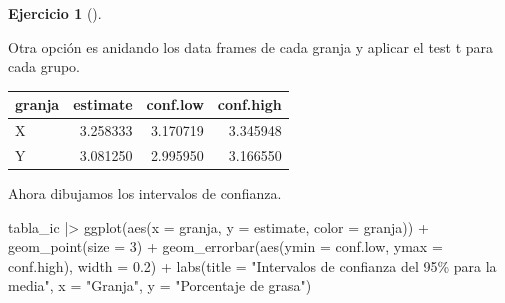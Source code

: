 \documentclass[
  a4paper,
]{scrreport}
\newenvironment{Shaded}{\begin{snugshade}}{\end{snugshade}}
\newcommand{\AttributeTok}[1]{\textcolor[rgb]{0.40,0.45,0.13}{#1}}
\newcommand{\DecValTok}[1]{\textcolor[rgb]{0.68,0.00,0.00}{#1}}
\newcommand{\FloatTok}[1]{\textcolor[rgb]{0.68,0.00,0.00}{#1}}
\newcommand{\FunctionTok}[1]{\textcolor[rgb]{0.28,0.35,0.67}{#1}}
\newcommand{\NormalTok}[1]{\textcolor[rgb]{0.00,0.23,0.31}{#1}}
\newcommand{\OtherTok}[1]{\textcolor[rgb]{0.00,0.23,0.31}{#1}}
\newcommand{\SpecialCharTok}[1]{\textcolor[rgb]{0.37,0.37,0.37}{#1}}
\newcommand{\StringTok}[1]{\textcolor[rgb]{0.13,0.47,0.30}{#1}}
\theoremstyle{definition}
\newtheorem{exercise}{Ejercicio}[chapter]
\theoremstyle{remark}
\begin{document}
\begin{exercise}[]
\begin{enumerate}
\begin{tcolorbox}
  Otra opción es anidando los data frames de cada granja y aplicar el
  test t para cada grupo.

\begin{Shaded}
\end{Shaded}

  \begin{longtable}[]{@{}lrrr@{}}
  \toprule\noalign{}
  granja & estimate & conf.low & conf.high \\
  \midrule\noalign{}
  \endhead
  \bottomrule\noalign{}
  \endlastfoot
  X & 3.258333 & 3.170719 & 3.345948 \\
  Y & 3.081250 & 2.995950 & 3.166550 \\
  \end{longtable}

  Ahora dibujamos los intervalos de confianza.

\begin{Shaded}
\begin{Highlighting}[]
\NormalTok{tabla\_ic  }\SpecialCharTok{|\textgreater{}} 
    \FunctionTok{ggplot}\NormalTok{(}\FunctionTok{aes}\NormalTok{(}\AttributeTok{x =}\NormalTok{ granja, }\AttributeTok{y =}\NormalTok{ estimate, }\AttributeTok{color =}\NormalTok{ granja)) }\SpecialCharTok{+}
    \FunctionTok{geom\_point}\NormalTok{(}\AttributeTok{size =} \DecValTok{3}\NormalTok{) }\SpecialCharTok{+}
    \FunctionTok{geom\_errorbar}\NormalTok{(}\FunctionTok{aes}\NormalTok{(}\AttributeTok{ymin =}\NormalTok{ conf.low, }\AttributeTok{ymax =}\NormalTok{ conf.high), }\AttributeTok{width =} \FloatTok{0.2}\NormalTok{) }\SpecialCharTok{+}
    \FunctionTok{labs}\NormalTok{(}\AttributeTok{title =} \StringTok{"Intervalos de confianza del 95\% para la media"}\NormalTok{, }\AttributeTok{x =} \StringTok{"Granja"}\NormalTok{, }\AttributeTok{y =} \StringTok{"Porcentaje de grasa"}\NormalTok{)}
\end{Highlighting}
\end{Shaded}


\end{tcolorbox}
\end{enumerate}
\end{exercise}
\end{document}

